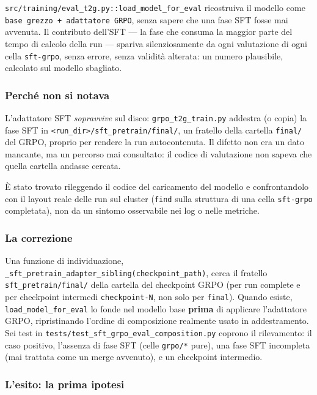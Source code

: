 \texttt{src/training/eval\_t2g.py::load\_model\_for\_eval} ricostruiva il
modello come \texttt{base grezzo + adattatore GRPO}, senza sapere che una fase
SFT fosse mai avvenuta. Il contributo dell'SFT --- la fase che consuma la
maggior parte del tempo di calcolo della run --- spariva silenziosamente da
ogni valutazione di ogni cella \texttt{sft-grpo}, senza errore, senza validità
alterata: un numero plausibile, calcolato sul modello sbagliato.

\subsubsection{Perché non si notava}

L'adattatore SFT \emph{sopravvive} sul disco: \texttt{grpo\_t2g\_train.py}
addestra (o copia) la fase SFT in
\texttt{<run\_dir>/sft\_pretrain/final/}, un fratello della cartella
\texttt{final/} del GRPO, proprio per rendere la run autocontenuta. Il difetto
non era un dato mancante, ma un percorso mai consultato: il codice di
valutazione non sapeva che quella cartella andasse cercata.

È stato trovato rileggendo il codice del caricamento del modello e
confrontandolo con il layout reale delle run sul cluster (\texttt{find} sulla
struttura di una cella \texttt{sft-grpo} completata), non da un sintomo
osservabile nei log o nelle metriche.

\subsubsection{La correzione}

Una funzione di individuazione,
\texttt{\_sft\_pretrain\_adapter\_sibling(checkpoint\_path)}, cerca il fratello
\texttt{sft\_pretrain/final/} della cartella del checkpoint GRPO (per run
complete e per checkpoint intermedi \texttt{checkpoint-N}, non solo per
\texttt{final}). Quando esiste, \texttt{load\_model\_for\_eval} lo fonde nel
modello base \textbf{prima} di applicare l'adattatore GRPO, ripristinando
l'ordine di composizione realmente usato in addestramento. Sei test in
\texttt{tests/test\_sft\_grpo\_eval\_composition.py} coprono il rilevamento:
il caso positivo, l'assenza di fase SFT (celle \texttt{grpo/*} pure), una fase
SFT incompleta (mai trattata come un merge avvenuto), e un checkpoint
intermedio.

\subsubsection{L'esito: la prima ipotesi}
\label{sec:sft-merge-non-rimisurato}

